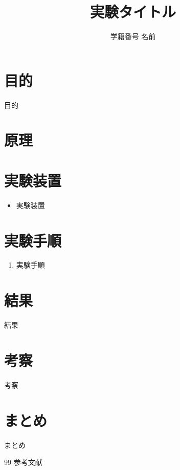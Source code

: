 \documentclass{ltjsarticle}
\title{実験タイトル}
\author{学籍番号 名前}
\begin{document}
\maketitle
\thispagestyle{empty}
\newpage

\section{目的}
目的

\section{原理}


\section{実験装置}
\begin{itemize}
    \item 実験装置
\end{itemize}

\section{実験手順}
\begin{enumerate}
    \item 実験手順
\end{enumerate}

\section{結果}
結果

\section{考察}
考察

\section{まとめ}
まとめ

\begin{thebibliography}{99} %
 参考文献
\end{thebibliography}




\end{document}
